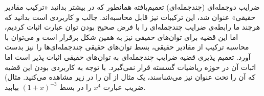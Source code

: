 \begin{extra}{ضرایب دوجمله‌ای (چندجمله‌ای) تعمیم‌یافته}
\p
همانطور که در بیشتر بدانید «ترکیب مقادیر حقیقی» عنوان شد، این ترکیبات نیز قابل محاسبه‌اند.
جالب و کاربردی است بدانید که هرچند ما رابطه‌ی ضرایب چندجمله‌ای را با فرض صحیح
بودن توان عبارت اثبات کردیم، اما این قضیه برای توان‌های حقیقی نیز به همین شکل برقرار است
و می‌توان با محاسبه ترکیب از مقادیر حقیقی، بسط توان‌های حقیقی چندجمله‌ای‌ها را نیز بدست آورد.
تعمیم پذیری قضیه ضرایب چندجمله‌ای به توان‌های حقیقی اثبات پذیر است اما اثبات آن در حوزه ریاضیات گسسته قرار نمی‌گیرد.
با توجه به کاربردی بودن این قضیه که آن را تحت عنوان
نیز می‌شناسند، یک مثال از آن را در زیر مشاهده می‌کنید.
\p
مثال)
ضریب عبارت
$x^4$
را در بسط
$(1+x)^{-3}$
بیابید.
\end{extra}